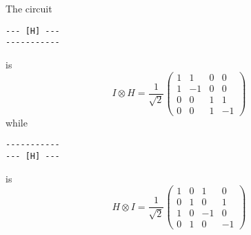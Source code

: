 \begingroup
%
\par The circuit
%
\begin{verbatim}
--- [H] ---
-----------
\end{verbatim}
%
is
%
$$
I \otimes H = \frac{1}{\sqrt{2}} \begin{pmatrix} 1 & 1 & 0 & 0\\ 1 & -1 & 0 & 0 \\ 0 & 0 & 1 & 1 \\ 0 & 0 & 1 & -1 \end{pmatrix}
$$
%
while
%
\begin{verbatim}
-----------
--- [H] ---
\end{verbatim}
%
is
%
$$
H \otimes I = \frac{1}{\sqrt{2}} \begin{pmatrix} 1 & 0 & 1 & 0 \\ 0 & 1 & 0 & 1 \\ 1 & 0 & -1 & 0 \\ 0 & 1 & 0 & -1 \end{pmatrix}
$$
%
\endgroup

